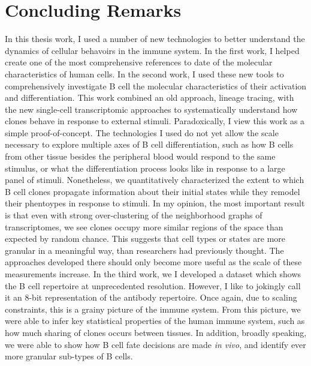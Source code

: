 \chapter{Concluding Remarks}
In this thesis work, I used a number of new technologies to better understand the dynamics of cellular behavoirs in the immune system. In the first work, I helped create one of the most comprehensive references to date of the molecular characteristics of human cells. In the second work, I used these new tools to comprehensively investigate B cell the molecular characteristics of their activation and differentiation. This work combined an old approach, lineage tracing, with the new single-cell transcriptomic approaches to systematically understand how clones behave in response to external stimuli. Paradoxically, I view this work as a simple proof-of-concept. The technologies I used do not yet allow the scale necessary to explore multiple axes of B cell differentiation, such as how B cells from other tissue besides the peripheral blood would respond to the same stimulus, or what the differentiation process looks like in response to a large panel of stimuli. Nonetheless, we quantitatively characterized the extent to which B cell clones propagate information about their initial states while they remodel their phentoypes in response to stimuli. In my opinion, the most important result is that even with strong over-clustering of the neighborhood graphs of transcriptomes, we see clones occupy more similar regions of the space than expected by random chance. This suggests that cell types or states are more granular in a meaningful way, than researchers had previously thought. The approaches developed there should only become more useful as the scale of these measurements increase. In the third work, we I developed a dataset which shows the B cell repertoire at unprecedented resolution. However, I like to jokingly call it an 8-bit representation of the antibody repertoire. Once again, due to scaling constraints, this is a grainy picture of the immune system. From this picture, we were able to infer key statistical properties of the human immune system, such as how much sharing of clones occurs between tissues. In addition, broadly speaking, we were able to show how B cell fate decisions are made \textit{in vivo}, and identify ever more granular sub-types of B cells.
